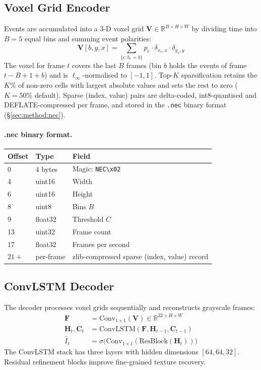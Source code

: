 \documentclass[10pt,twocolumn,letterpaper]{article}
\begin{document}
\subsection{Voxel Grid Encoder}
\label{sec:method:enc}

Events are accumulated into a 3-D voxel grid
$\mathbf{V} \in \mathbb{R}^{B \times H \times W}$
by dividing time into $B = 5$ equal bins and summing event polarities:
\begin{equation}
  \mathbf{V}[b, y, x] = \sum_{\{e : b_e = b\}} p_e \cdot \delta_{x_e, x} \cdot \delta_{y_e, y}
\end{equation}
The voxel for frame $t$ covers the last $B$ frames (bin $b$ holds the events of frame $t-B+1+b$) and is $\ell_\infty$-normalised to $[-1, 1]$.
Top-$K$ sparsification retains the $K\%$ of non-zero cells with largest absolute values
and sets the rest to zero ($K = 50\%$ default).
Sparse (index, value) pairs are delta-coded, int8-quantised and DEFLATE-compressed per frame, and stored in the
\texttt{.nec} binary format (§\ref{sec:method:nec}).

\paragraph{.nec binary format.}
\begin{table}[h]
\small
\centering
\begin{tabular}{@{}lll@{}}
\toprule
Offset & Type & Field \\ \midrule
0      & 4 bytes & Magic: \texttt{NEC\textbackslash x02} \\
4      & uint16  & Width \\
6      & uint16  & Height \\
8      & uint8   & Bins $B$ \\
9      & float32 & Threshold $C$ \\
13     & uint32  & Frame count \\
17     & float32 & Frames per second \\
$21+$  & per-frame & zlib-compressed sparse (index, value) record \\ \bottomrule
\end{tabular}
\end{table}

\subsection{ConvLSTM Decoder}
\label{sec:method:dec}

The decoder processes voxel grids sequentially and reconstructs
grayscale frames:
\begin{align}
  \mathbf{F} &= \text{Conv}_{1\times1}(\mathbf{V}) \in \mathbb{R}^{32 \times H \times W} \\
  \mathbf{H}_t, \mathbf{C}_t &= \text{ConvLSTM}(\mathbf{F}, \mathbf{H}_{t-1}, \mathbf{C}_{t-1}) \\
  \hat{I}_t &= \sigma\bigl(\text{Conv}_{1\times1}(\text{ResBlock}(\mathbf{H}_t))\bigr)
\end{align}
The ConvLSTM stack has three layers with hidden dimensions $[64, 64, 32]$.
Residual refinement blocks improve fine-grained texture recovery.
\end{document}
